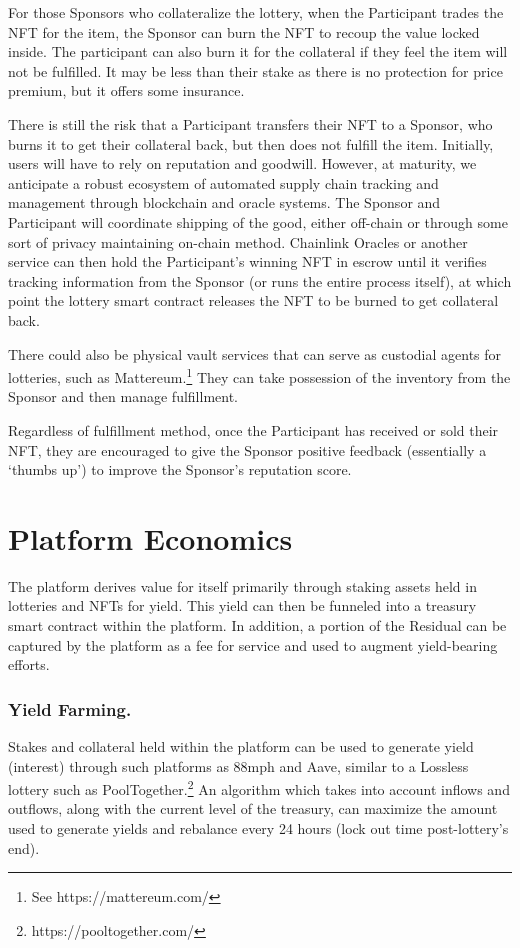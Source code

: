 \documentclass[runningheads]{llncs}
\begin{document}
For those Sponsors who collateralize the lottery, when the Participant trades the NFT for the item, the Sponsor can burn the NFT to recoup the value locked inside.  The participant can also burn it for the collateral if they feel the item will not be fulfilled.  It may be less than their stake as there is no protection for price premium, but it offers some insurance.  

There is still the risk that a Participant transfers their NFT to a Sponsor, who burns it to get their collateral back, but then does not fulfill the item.  Initially, users will have to rely on reputation and goodwill.  However, at maturity, we anticipate a robust ecosystem of automated supply chain tracking and management through blockchain and oracle systems.  The Sponsor and Participant will coordinate shipping of the good, either off-chain or through some sort of privacy maintaining on-chain method.  Chainlink Oracles or another service can then hold the Participant’s winning NFT in escrow until it verifies tracking information from the Sponsor (or runs the entire process itself), at which point the lottery smart contract releases the NFT to be burned to get collateral back.

There could also be physical vault services that can serve as custodial agents for lotteries, such as Mattereum.\footnote{See https://mattereum.com/}  They can take possession of the inventory from the Sponsor and then manage fulfillment.

Regardless of fulfillment method, once the Participant has received or sold their NFT, they are encouraged to give the Sponsor positive feedback (essentially a ‘thumbs up’) to improve the Sponsor’s reputation score.


\section{Platform Economics}\label{section-PlatformEconomics}

The platform derives value for itself primarily through staking assets held in lotteries and NFTs for yield.  This yield can then be funneled into a treasury smart contract within the platform.  In addition, a portion of the Residual can be captured by the platform as a fee for service and used to augment yield-bearing efforts.

\subsubsection{Yield Farming.}  Stakes and collateral held within the platform can be used to generate yield (interest) through such platforms as 88mph and Aave, similar to a Lossless lottery such as PoolTogether.\footnote{https://pooltogether.com/}   An algorithm which takes into account inflows and outflows, along with the current level of the treasury, can maximize the amount used to generate yields and rebalance every 24 hours (lock out time post-lottery’s end).  
\end{document}
